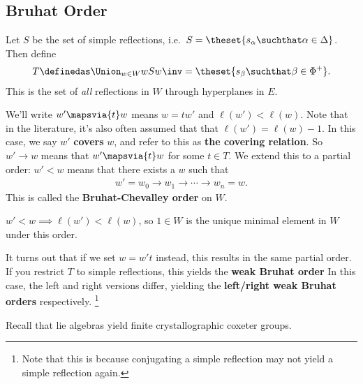 \hypertarget{bruhat-order}{%
\subsection{Bruhat Order}\label{bruhat-order}}

\begin{definition}

Let \(S\) be the set of simple reflections,
i.e.~\(S = \theset{s_\alpha \suchthat \alpha \in \Delta}\). Then define
\begin{align*}
T \definedas \Union_{w\in W} wSw\inv = \theset{s_\beta \suchthat \beta\in\Phi^+}
.\end{align*} This is the set of \emph{all} reflections in \(W\) through
hyperplanes in \(E\).

We'll write \(w' \mapsvia{t} w\) means \(w=tw'\) and
\(\ell(w') < \ell(w)\). Note that in the literature, it's also often
assumed that that \(\ell(w') = \ell(w) - 1\). In this case, we say
\(w'\) \textbf{covers} \(w\), and refer to this as \textbf{the covering
relation}. So \(w' \to w\) means that \(w' \mapsvia{t} w\) for some
\(t\in T\). We extend this to a partial order: \(w' < w\) means that
there exists a \(w\) such that
\begin{align*}
w' = w_0 \to w_1 \to \cdots \to w_n = w.
\end{align*} This is called the \textbf{Bruhat-Chevalley order} on
\(W\).

\end{definition}

\begin{corollary}[?]

\(w' < w \implies \ell(w') < \ell(w)\), so \(1\in W\) is the unique
minimal element in \(W\) under this order.

\end{corollary}

It turns out that if we set \(w = w' t\) instead, this results in the
same partial order. If you restrict \(T\) to simple reflections, this
yields the \textbf{weak Bruhat order} In this case, the left and right
versions differ, yielding the \textbf{left/right weak Bruhat orders}
respectively. \footnote{Note that this is because conjugating a simple
  reflection may not yield a simple reflection again.}

Recall that lie algebras yield finite crystallographic coxeter groups.

